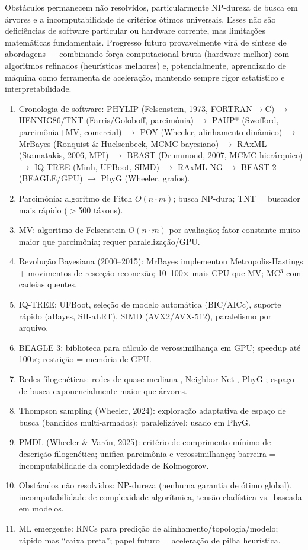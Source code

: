 Obstáculos permanecem não resolvidos, particularmente NP-dureza de busca em árvores e a incomputabilidade de critérios ótimos universais. Esses não são deficiências de software particular ou hardware corrente, mas limitações matemáticas fundamentais. Progresso futuro provavelmente virá de síntese de abordagens --- combinando força computacional bruta (hardware melhor) com algoritmos refinados (heurísticas melhores) e, potencialmente, aprendizado de máquina como ferramenta de aceleração, mantendo sempre rigor estatístico e interpretabilidade.

\clearpage
\begin{revise}\small
\begin{enumerate}[itemsep=0pt, topsep=0pt, parsep=0pt]
    \item Cronologia de software: PHYLIP (Felsenstein, 1973, FORTRAN$\to$C) $\to$ HENNIG86/TNT (Farris/Goloboff, parcimônia) $\to$ PAUP* (Swofford, parcimônia+MV, comercial) $\to$ POY (Wheeler, alinhamento dinâmico) $\to$ MrBayes (Ronquist \& Huelsenbeck, MCMC bayesiano) $\to$ RAxML (Stamatakis, 2006, MPI) $\to$ BEAST (Drummond, 2007, MCMC hierárquico) $\to$ IQ-TREE (Minh, UFBoot, SIMD) $\to$ RAxML-NG $\to$ BEAST 2 (BEAGLE/GPU) $\to$ PhyG (Wheeler, grafos).
    \item Parcimônia: algoritmo de Fitch $O(n\cdot m)$; busca NP-dura; TNT = buscador mais rápido ($>$500 táxons).
    \item MV: algoritmo de Felsenstein $O(n\cdot m)$ por avaliação; fator constante muito maior que parcimônia; requer paralelização/GPU.
    \item Revolução Bayesiana (2000--2015): MrBayes implementou Metropolis-Hastings + movimentos de resecção-reconexão; 10--100$\times$ mais CPU que MV; MC$^3$ com cadeias quentes.
    \item IQ-TREE: UFBoot, seleção de modelo automática (BIC/AICc), suporte rápido (aBayes, SH-aLRT), SIMD (AVX2/AVX-512), paralelismo por arquivo.
    \item BEAGLE 3: biblioteca para cálculo de verossimilhança em GPU; speedup até 100$\times$; restrição = memória de GPU.
    \item Redes filogenéticas: redes de quase-mediana \parencite{holland2004}, Neighbor-Net \parencite{bryant2004}, PhyG \parencite{wheeler2024a}; espaço de busca exponencialmente maior que árvores.
    \item Thompson sampling (Wheeler, 2024): exploração adaptativa de espaço de busca (bandidos multi-armados); paralelizável; usado em PhyG.
    \item PMDL (Wheeler \& Varón, 2025): critério de comprimento mínimo de descrição filogenética; unifica parcimônia e verossimilhança; barreira = incomputabilidade da complexidade de Kolmogorov.
    \item Obstáculos não resolvidos: NP-dureza (nenhuma garantia de ótimo global), incomputabilidade de complexidade algorítmica, tensão cladística vs.\ baseada em modelos.
    \item ML emergente: RNCs para predição de alinhamento/topologia/modelo; rápido mas ``caixa preta''; papel futuro = aceleração de pilha heurística.
\end{enumerate}
\end{revise}

\clearpage

\printbibliography[heading=subbibliography,title={Referências}]

